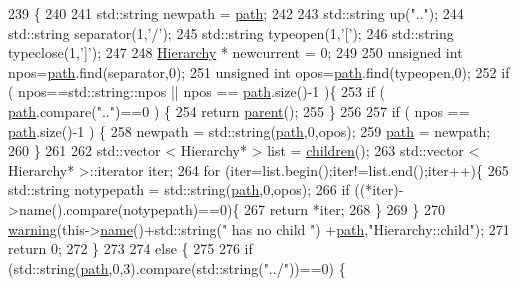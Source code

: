 \begin{DoxyCode}
239                                               \{
240 
241   std::string newpath = \hyperlink{classHierarchy_aa7990fa7caf132d83e361ce033c6c65a}{path};
242 
243   std::string up(\textcolor{stringliteral}{".."});
244   std::string separator(1,\textcolor{charliteral}{'/'});
245   std::string typeopen(1,\textcolor{charliteral}{'['});
246   std::string typeclose(1,\textcolor{charliteral}{']'});
247 
248   \hyperlink{classHierarchy}{Hierarchy} * newcurrent = 0;
249 
250   \textcolor{keywordtype}{unsigned} \textcolor{keywordtype}{int} npos=\hyperlink{classHierarchy_aa7990fa7caf132d83e361ce033c6c65a}{path}.find(separator,0);
251   \textcolor{keywordtype}{unsigned} \textcolor{keywordtype}{int} opos=\hyperlink{classHierarchy_aa7990fa7caf132d83e361ce033c6c65a}{path}.find(typeopen,0);
252   \textcolor{keywordflow}{if} ( npos==std::string::npos || npos == \hyperlink{classHierarchy_aa7990fa7caf132d83e361ce033c6c65a}{path}.size()-1 )\{
253     \textcolor{keywordflow}{if} ( \hyperlink{classHierarchy_aa7990fa7caf132d83e361ce033c6c65a}{path}.compare(\textcolor{stringliteral}{".."})==0 ) \{
254       \textcolor{keywordflow}{return} \hyperlink{classHierarchy_a1c7bec8257e717f9c1465e06ebf845fc}{parent}();
255     \}
256 
257     \textcolor{keywordflow}{if} ( npos == \hyperlink{classHierarchy_aa7990fa7caf132d83e361ce033c6c65a}{path}.size()-1 ) \{
258       newpath = std::string(\hyperlink{classHierarchy_aa7990fa7caf132d83e361ce033c6c65a}{path},0,opos);
259       \hyperlink{classHierarchy_aa7990fa7caf132d83e361ce033c6c65a}{path} = newpath;
260     \}
261 
262     std::vector < Hierarchy* > list = \hyperlink{classHierarchy_aa9a76f69e98e052ee1a6e32cea006288}{children}();
263     std::vector < Hierarchy* >::iterator iter;
264     \textcolor{keywordflow}{for} (iter=list.begin();iter!=list.end();iter++)\{
265       std::string notypepath = std::string(\hyperlink{classHierarchy_aa7990fa7caf132d83e361ce033c6c65a}{path},0,opos);
266       \textcolor{keywordflow}{if} ((*iter)->name().compare(notypepath)==0)\{
267         \textcolor{keywordflow}{return} *iter;
268       \}
269     \}
270     \hyperlink{classObject_a65cd4fda577711660821fd2cd5a3b4c9}{warning}(this->\hyperlink{classObject_a300f4c05dd468c7bb8b3c968868443c1}{name}()+std::string(\textcolor{stringliteral}{" has no child "}) +\hyperlink{classHierarchy_aa7990fa7caf132d83e361ce033c6c65a}{path},\textcolor{stringliteral}{"Hierarchy::child"});
271     \textcolor{keywordflow}{return} 0;
272   \}
273 
274   \textcolor{keywordflow}{else} \{
275 
276     \textcolor{keywordflow}{if} (std::string(\hyperlink{classHierarchy_aa7990fa7caf132d83e361ce033c6c65a}{path},0,3).compare(std::string(\textcolor{stringliteral}{"../"}))==0) \{

\end{DoxyCode}
